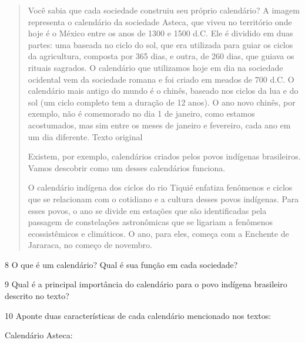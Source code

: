 \begin{quote}
Você sabia que cada sociedade construiu seu próprio calendário? A imagem representa o calendário da sociedade Asteca, que viveu no território onde hoje é o México entre os anos de 1300 e 1500 d.C. Ele
é dividido em duas partes: uma baseada no ciclo do sol, que era utilizada para guiar os ciclos da agricultura, composta por 365 dias, e outra, de 260 dias, que guiava os rituais sagrados. O calendário que
utilizamos hoje em dia na sociedade ocidental vem da sociedade romana e foi criado em meados de 700 d.C. O calendário mais antigo do mundo é o chinês, baseado nos ciclos da lua e do sol (um ciclo completo tem a duração de 12 anos). O ano novo chinês, por exemplo, não é comemorado no dia 1 de janeiro, como estamos acostumados, mas sim entre os meses de janeiro e fevereiro, cada ano em um dia diferente. Texto original

Existem, por exemplo, calendários criados pelos povos indígenas brasileiros. Vamos descobrir como um desses calendários funciona.

O calendário indígena dos ciclos do rio Tiquié enfatiza fenômenos e ciclos que se relacionam com o cotidiano e a cultura desses povos indígenas. Para esses povos, o ano se divide em estações que são identificadas pela passagem de constelações astronômicas que se ligariam a fenômenos ecossistêmicos e climáticos. O ano, para eles, começa com a Enchente de Jararaca, no começo de novembro.

\end{quote}

\num{8} O que é um calendário? Qual é sua função em cada sociedade?


\num{9} Qual é a principal importância do calendário para o povo indígena brasileiro descrito no texto?


\pagebreak
\num{10} Aponte duas características de cada calendário mencionado nos textos:

Calendário Asteca:


